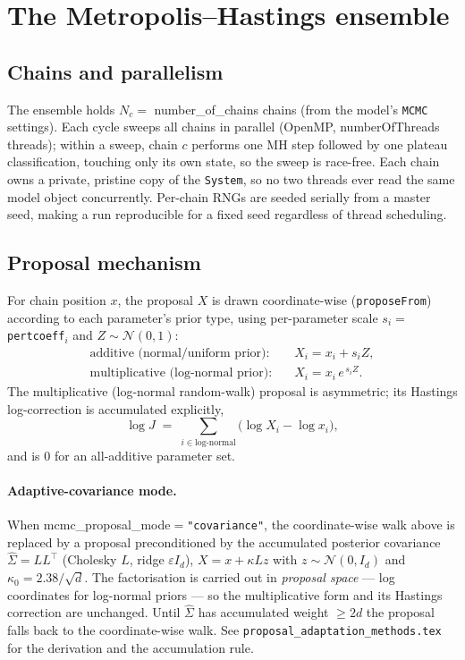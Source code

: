 \documentclass[11pt]{article}
\newcommand{\code}[1]{\texttt{\small #1}}
\newcommand{\param}[1]{\textsf{#1}}
\begin{document}
\section{The Metropolis--Hastings ensemble}

\subsection{Chains and parallelism}
The ensemble holds $N_c=$ \param{number\_of\_chains} chains (from the
model's \code{MCMC} settings). Each cycle sweeps all chains in parallel
(OpenMP, \param{numberOfThreads} threads); within a sweep, chain $c$
performs one MH step followed by one plateau classification, touching
only its own state, so the sweep is race-free. Each chain owns a
private, pristine copy of the \code{System}, so no two threads ever read
the same model object concurrently. Per-chain RNGs are seeded serially
from a master seed, making a run reproducible for a fixed seed regardless
of thread scheduling.

\subsection{Proposal mechanism}\label{sec:proposal}
For chain position $x$, the proposal $X$ is drawn coordinate-wise
(\code{proposeFrom}) according to each parameter's prior type, using
per-parameter scale $s_i=$ \code{pertcoeff}$_i$ and $Z\sim\mathcal N(0,1)$:
\begin{align}
  \text{additive (normal/uniform prior):}\quad & X_i = x_i + s_i Z,\\
  \text{multiplicative (log-normal prior):}\quad & X_i = x_i \,e^{\,s_i Z}.
\end{align}
The multiplicative (log-normal random-walk) proposal is asymmetric; its
Hastings log-correction is accumulated explicitly,
\begin{equation}
  \log J \;=\; \sum_{i \in \text{log-normal}} \big(\log X_i - \log x_i\big),
\end{equation}
and is $0$ for an all-additive parameter set.

\paragraph{Adaptive-covariance mode.} When
\param{mcmc\_proposal\_mode}${}=$\code{"covariance"}, the coordinate-wise
walk above is replaced by a proposal preconditioned by the accumulated
posterior covariance $\hat\Sigma = LL^{\!\top}$ (Cholesky $L$, ridge
$\varepsilon I_d$), $X = x + \kappa L z$ with $z\sim\mathcal N(0,I_d)$ and
$\kappa_0 = 2.38/\sqrt d$. The factorisation is carried out in
\emph{proposal space} --- log coordinates for log-normal priors --- so the
multiplicative form and its Hastings correction are unchanged. Until
$\hat\Sigma$ has accumulated weight $\ge 2d$ the proposal falls back to the
coordinate-wise walk. See \code{proposal\_adaptation\_methods.tex} for the
derivation and the accumulation rule.
\end{document}
